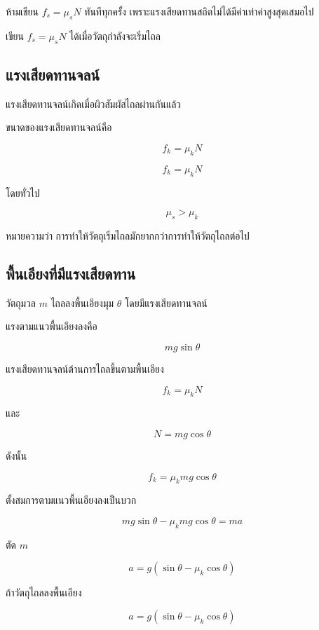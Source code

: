 \begin{tcolorbox}[title=ข้อควรระวัง]
ห้ามเขียน $f_s=\mu_s N$ ทันทีทุกครั้ง เพราะแรงเสียดทานสถิตไม่ได้มีค่าเท่าค่าสูงสุดเสมอไป

เขียน $f_s=\mu_s N$ ได้เมื่อวัตถุกำลังจะเริ่มไถล
\end{tcolorbox}

\subsection{แรงเสียดทานจลน์}

แรงเสียดทานจลน์เกิดเมื่อผิวสัมผัสไถลผ่านกันแล้ว

ขนาดของแรงเสียดทานจลน์คือ

\[
f_k=\mu_k N
\]

\begin{tcolorbox}[title=แรงเสียดทานจลน์]
\[
f_k=\mu_k N
\]
\end{tcolorbox}

โดยทั่วไป

\[
\mu_s>\mu_k
\]

หมายความว่า การทำให้วัตถุเริ่มไถลมักยากกว่าการทำให้วัตถุไถลต่อไป

\subsection{พื้นเอียงที่มีแรงเสียดทาน}

วัตถุมวล $m$ ไถลลงพื้นเอียงมุม $\theta$ โดยมีแรงเสียดทานจลน์

แรงตามแนวพื้นเอียงลงคือ

\[
mg\sin\theta
\]

แรงเสียดทานจลน์ต้านการไถลขึ้นตามพื้นเอียง

\[
f_k=\mu_k N
\]

และ

\[
N=mg\cos\theta
\]

ดังนั้น

\[
f_k=\mu_k mg\cos\theta
\]

ตั้งสมการตามแนวพื้นเอียงลงเป็นบวก

\[
mg\sin\theta-\mu_k mg\cos\theta=ma
\]

ตัด $m$

\[
a=g(\sin\theta-\mu_k\cos\theta)
\]

\begin{tcolorbox}[title=พื้นเอียงมีแรงเสียดทานจลน์]
ถ้าวัตถุไถลลงพื้นเอียง

\[
a=g(\sin\theta-\mu_k\cos\theta)
\]
\end{tcolorbox}

